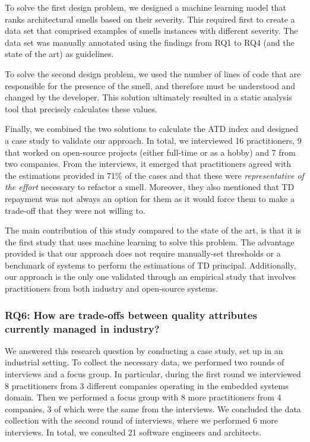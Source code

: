 To solve the first design problem, we designed a machine learning model that ranks architectural smells based on their severity. 
This required first to create a data set that comprised examples of smells instances with different severity. The data set was manually annotated using the findings from RQ1 to RQ4 (and the state of the art) as guidelines. 

To solve the second design problem, we used the number of lines of code that are responsible for the presence of the smell, and therefore must be understood and changed by the developer.
This solution ultimately resulted in a static analysis tool that precisely calculates these values.

Finally, we combined the two solutions to calculate the ATD index and designed a case study to validate our approach.
In total, we interviewed 16 practitioners, 9 that worked on open-source projects (either full-time or as a hobby) and 7 from two companies.
From the interviews, it emerged that practitioners agreed with the estimations provided in 71\% of the cases and that these were \emph{representative of the effort} necessary to refactor a smell.
Moreover, they also mentioned that TD repayment was not always an option for them as it would force them to make a trade-off that they were not willing to.

The main contribution of this study compared to the state of the art, is that it is the first study that uses machine learning to solve this problem.
The advantage provided is that our approach does not require manually-set thresholds or a benchmark of systems to perform the estimations of TD principal.
Additionally, our approach is the only one validated through an empirical study that involves practitioners from both industry and open-source systems.

\subsubsection*{RQ6: How are trade-offs between quality attributes currently managed in industry?}
We answered this research question by conducting a case study, set up in an industrial setting.
To collect the necessary data, we performed two rounds of interviews and a focus group.
In particular, during the first round we interviewed 8 practitioners from 3 different companies operating in the embedded systems domain.
Then we performed a focus group with 8 more practitioners from 4 companies, 3 of which were the same from the interviews.
We concluded the data collection with the second round of interviews, where we performed 6 more interviews.
In total, we consulted 21 software engineers and architects.

